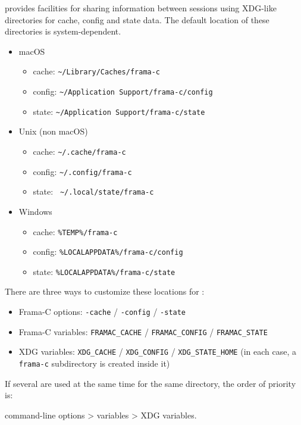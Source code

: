 \FramaC provides facilities for sharing information between sessions using
XDG-like directories for cache, config and state data. The default location of
these directories is system-dependent.

\begin{itemize}
  \item macOS
  \begin{itemize}
    \item cache: \lstinline{~/Library/Caches/frama-c}
    \item config: \lstinline{~/Application Support/frama-c/config}
    \item state: \lstinline{~/Application Support/frama-c/state}
  \end{itemize}
  \item Unix (non macOS)
  \begin{itemize}
    \item cache: \lstinline{~/.cache/frama-c}
    \item config: \lstinline{~/.config/frama-c}
    \item state: \lstinline{ ~/.local/state/frama-c}
  \end{itemize}
  \item Windows
  \begin{itemize}
    \item cache: \lstinline{%TEMP%/frama-c}
    \item config: \lstinline{%LOCALAPPDATA%/frama-c/config}
    \item state: \lstinline{%LOCALAPPDATA%/frama-c/state}
  \end{itemize}
\end{itemize}

There are three ways to customize these locations for \FramaC:
\begin{itemize}
  \item Frama-C options: \lstinline{-cache} / \lstinline{-config} / \lstinline{-state}
  \item Frama-C variables: \lstinline{FRAMAC_CACHE} / \lstinline{FRAMAC_CONFIG} / \lstinline{FRAMAC_STATE}
  \item XDG variables: \lstinline{XDG_CACHE} / \lstinline{XDG_CONFIG} / \lstinline{XDG_STATE_HOME}
    (in each case, a \lstinline{frama-c} subdirectory is created inside it)
\end{itemize}

If several are used at the same time for the same directory, the order of
priority is: \\
\centerline{\FramaC command-line options > \FramaC variables > XDG variables.}

